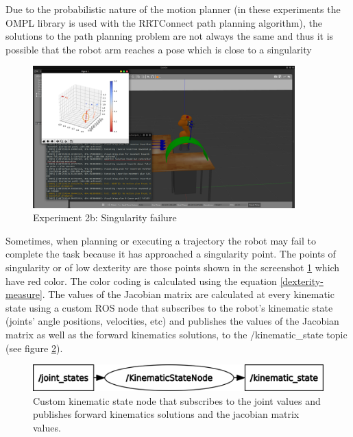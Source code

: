 Due to the probabilistic nature of the motion planner (in these experiments the OMPL library is used with the RRTConnect path planning algorithm), the solutions 
to the path planning problem are not always the same and thus it is possible that the robot arm reaches a pose which is close to a singularity
\begin{center}
\begin{figure}[!htb]
\centering
\includegraphics[width=0.9\textwidth]{images/robot_planner2b/singularity_failure.png}
\caption{Experiment 2b: Singularity failure}
\label{robot-planner2b-singularity-failure}
\end{figure}
\end{center}

Sometimes, when planning or executing a trajectory the robot may fail to complete the task because it has approached a singularity point. The points of singularity or of low dexterity are those points shown in the screenshot 
\ref{robot-planner2b-singularity-failure} which have red color. The color coding is calculated using the equation \ref{dexterity-measure}. The values of the Jacobian matrix are calculated at every kinematic state using 
a custom ROS node that subscribes to the robot's kinematic state (joints' angle positions, velocities, etc) and publishes the values of the Jacobian matrix as well as the forward kinematics solutions, to the 
/kinematic\_state topic (see figure \ref{kinematic-state-topic-graph}).

\begin{center}
\begin{figure}[!htb]
\centering
\includegraphics[width=\textwidth]{images/kinematic_state_topic_graph.png}
\caption{Custom kinematic state node that subscribes to the joint values and publishes forward kinematics solutions and the jacobian matrix values.}
\label{kinematic-state-topic-graph}
\end{figure}
\end{center}


